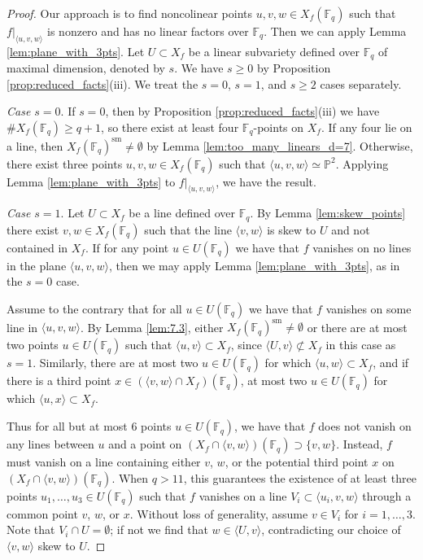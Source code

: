 \documentclass{amsart}
\newcommand{\F}{\mathbb{F}}
\renewcommand{\P}{\mathbb{P}}
\newcommand{\Span}[1]{\langle #1 \rangle}
\newcommand{\sm}{\mathrm{sm}}
\theoremstyle{definition}
\numberwithin{equation}{section}
\numberwithin{table}{section}
\newcommand{\qbound}[1]{{\color{cyan}$q > {#1}$}}
\renewcommand{\qbound}[1]{{$q > {#1}$}}
\begin{document}
\begin{proof}
    Our approach is to find noncolinear points $u,v,w \in X_f(\F_q)$ such that $f|_{\Span{u,v,w}}$ is nonzero and has no linear factors over $\F_q$. Then we can apply Lemma \ref{lem:plane_with_3pts}.	Let $U \subset X_f$ be a linear subvariety defined over $\F_q$ of maximal dimension, denoted by $s$. We have $s \geq 0$ by Proposition \ref{prop:reduced_facts}(iii). We treat the $s=0$, $s=1$, and $s \geq 2$ cases separately.

    \bigskip\noindent\textit{Case $s=0$}. If $s=0$, then by Proposition \ref{prop:reduced_facts}(iii) we have $\#X_f(\F_q) \geq q+1$, so there exist at least four $\F_q$-points on $X_f$. If any four lie on a line, then $X_f(\F_q)^\sm \neq \emptyset$ by Lemma \ref{lem:too_many_linears_d=7}. Otherwise, there exist three points $u,v,w \in X_f(\F_q)$ such that $\Span{u,v,w} \simeq \P^2$. Applying Lemma \ref{lem:plane_with_3pts} to $f|_{\Span{u,v,w}}$, we have the result.

    \bigskip\noindent\textit{Case $s=1$}. Let $U \subset X_f$ be a line defined over $\F_q$. By Lemma \ref{lem:skew_points} there exist $v,w \in X_f(\F_q)$ such that the line $\Span{v,w}$ is skew to $U$ and not contained in $X_f$. If for any point $u \in U(\F_q)$ we have that $f$ vanishes on no lines in the plane $\Span{u,v,w}$, then we may apply Lemma \ref{lem:plane_with_3pts}, as in the $s=0$ case. 

    Assume to the contrary that for all $u \in U(\F_q)$ we have that $f$ vanishes on some line in $\Span{u,v,w}$. By Lemma \ref{lem:7.3}, either $X_f(\F_q)^{\sm} \neq \emptyset$ or there are at most two points $u \in U(\F_q)$ such that $\Span{u,v} \subset X_f$, since $\Span{U,v} \not\subset X_f$ in this case as $s=1$. Similarly, there are at most two $u \in U(\F_q)$ for which $\Span{u,w} \subset X_f$, and if there is a third point $x \in (\Span{v,w} \cap X_f)(\F_q)$, at most two $u \in U(\F_q)$ for which $\Span{u,x} \subset X_f$.

    Thus for all but at most 6 points $u \in U(\F_q)$, we have that $f$ does not vanish on any lines between $u$ and a point on $(X_f \cap \Span{v,w})(\F_q) \supset \{v,w\}$. Instead, $f$ must vanish on a line containing either $v$, $w$, or the potential third point $x$ on $(X_f \cap \Span{v,w})(\F_q)$. When \qbound{11}, this guarantees the existence of at least three points $u_1, \ldots, u_3 \in U(\F_q)$ such that $f$ vanishes on a line $V_i \subset \Span{u_i, v, w}$ through a common point $v$, $w$, or $x$. Without loss of generality, assume $v \in V_i$ for $i=1, \ldots, 3$. Note that $V_i \cap U = \emptyset$; if not we find that $w \in \Span{U,v}$, contradicting our choice of $\Span{v,w}$ skew to $U$.


\end{proof}
\end{document}
